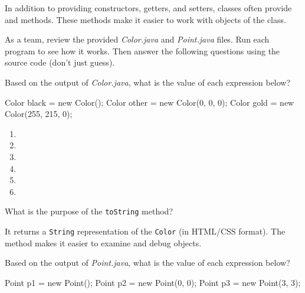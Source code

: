 
In addition to providing constructors, getters, and setters, classes often provide  and  methods.
These methods make it easier to work with objects of the class.

\vspace{1em}

As a team, review the provided \textit{Color.java} and \textit{Point.java} files.
Run each program to see how it works.
Then answer the following questions using the source code (don't just guess).




\Q Based on the output of \textit{Color.java}, what is the value of each expression below?

\begin{javalst}
Color black = new Color();
Color other = new Color(0, 0, 0);
Color gold = new Color(255, 215, 0);
\end{javalst}

\begin{multicols}{2}
\setlength{\defaultwidth}{5em}
\begin{enumerate}[itemsep=1pt]
\item {} 
\item {} 
\item {} 
\item {} 
\item {} 
\item {} 
\end{enumerate}
\end{multicols}


\Q What is the purpose of the \texttt{toString} method?

\begin{answer}
It returns a \texttt{String} representation of the \texttt{Color} (in HTML/CSS format).
The  method makes it easier to examine and debug objects.
\end{answer}


\Q \label{expr}
Based on the output of \textit{Point.java}, what is the value of each expression below?
\begin{javalst}
Point p1 = new Point();
Point p2 = new Point(0, 0);
Point p3 = new Point(3, 3);
\end{javalst}

